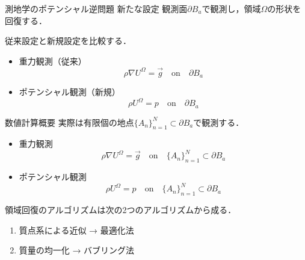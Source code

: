 \documentclass[dvipdfmx]{beamer}
\theoremstyle{remark}
\begin{document}
\begin{frame}{測地学のポテンシャル逆問題 新たな設定}
  観測面$\partial B_a$で観測し，領域$\Omega$の形状を回復する．
  \begin{figure}
    \centering
  \end{figure}

  従来設定と新規設定を比較する．
  \begin{itemize}
    \item 重力観測（従来）
    \[
      \rho\nabla U^{\Omega} = \overrightarrow{g} \quad \mathrm{on} \quad \partial B_a
    \]
  
    \item ポテンシャル観測（新規）
    \[
      \rho U^{\Omega} = p \quad \mathrm{on} \quad \partial B_a
    \]
  \end{itemize}
\end{frame}


\begin{frame}{数値計算概要}
  実際は有限個の地点$\{A_n\}_{n=1}^N\subset\partial B_a$で観測する．
  \begin{itemize}
    \item 重力観測
    \[
      \rho\nabla U^{\Omega} = \overrightarrow{g} \quad \mathrm{on} \quad \{A_n\}_{n=1}^N\subset \partial B_a
    \]
  
    \item ポテンシャル観測
    \[
      \rho U^{\Omega} = p \quad \mathrm{on} \quad \{A_n\}_{n=1}^N\subset \partial B_a
    \]
  \end{itemize}
  領域回復のアルゴリズムは次の2つのアルゴリズムから成る．

  \begin{enumerate}
    \item 質点系による近似 → 最適化法
    \item 質量の均一化 → バブリング法
  \end{enumerate}
  \ 
\end{frame}
\end{document}
